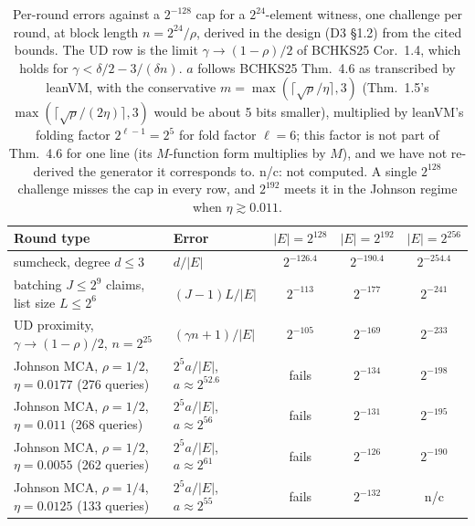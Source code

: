 \begin{table}[t]
\centering\small
\begin{tabularx}{\linewidth}{@{}>{\raggedright\arraybackslash}X>{\raggedright\arraybackslash}p{3.6cm}ccc@{}}
\toprule
Round type & Error & $|E|=2^{128}$ & $|E|=2^{192}$ & $|E|=2^{256}$ \\
\midrule
sumcheck, degree $d\le3$ & $d/|E|$ & $2^{-126.4}$ & $2^{-190.4}$ & $2^{-254.4}$ \\
batching $J\le2^9$ claims, list size $L\le2^6$ & $(J-1)L/|E|$ & $2^{-113}$ & $2^{-177}$ & $2^{-241}$ \\
UD proximity, $\gamma\to(1-\rho)/2$, $n=2^{25}$ \cite[Cor.~1.4]{BCHKS25} & $(\gamma n+1)/|E|$ & $2^{-105}$ & $2^{-169}$ & $2^{-233}$ \\
Johnson MCA, $\rho=1/2$, $\eta=0.0177$ (276 queries) \cite[Thm.~4.6]{BCHKS25} & $2^5a/|E|$, $a\approx2^{52.6}$ & fails & $2^{-134}$ & $2^{-198}$ \\
Johnson MCA, $\rho=1/2$, $\eta=0.011$ (268 queries) & $2^5a/|E|$, $a\approx2^{56}$ & fails & $2^{-131}$ & $2^{-195}$ \\
Johnson MCA, $\rho=1/2$, $\eta=0.0055$ (262 queries) & $2^5a/|E|$, $a\approx2^{61}$ & fails & $2^{-126}$ & $2^{-190}$ \\
Johnson MCA, $\rho=1/4$, $\eta=0.0125$ (133 queries) & $2^5a/|E|$, $a\approx2^{55}$ & fails & $2^{-132}$ & n/c \\
\bottomrule
\end{tabularx}
\caption{Per-round errors against a $2^{-128}$ cap for a $2^{24}$-element witness, one challenge
per round, at block length $n=2^{24}/\rho$, derived in the design (D3 §1.2) from the cited bounds.
The UD row is the limit $\gamma\to(1-\rho)/2$ of BCHKS25 Cor.~1.4, which holds for
$\gamma<\delta/2-3/(\delta n)$. $a$ follows BCHKS25 Thm.~4.6 as transcribed by leanVM, with the
conservative $m=\max(\lceil\sqrt\rho/\eta\rceil,3)$ (Thm.~1.5's $\max(\lceil\sqrt\rho/(2\eta)\rceil,3)$
would be about 5 bits smaller), multiplied by leanVM's folding factor $2^{\ell-1}=2^5$ for fold
factor $\ell=6$; this factor is not part of Thm.~4.6 for one line (its $M$-function form multiplies
by $M$), and we have not re-derived the generator it corresponds to. n/c: not computed. A single
$2^{128}$ challenge misses the cap in every row, and $2^{192}$ meets it in the Johnson regime when
$\eta\gtrsim0.011$.}
\label{tab:bg-binary-errors}
\end{table}

